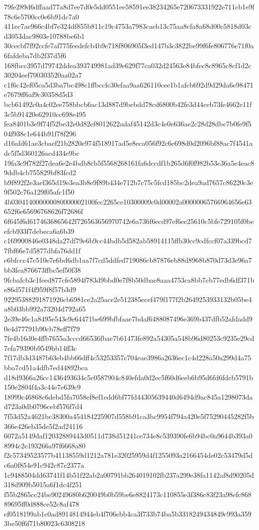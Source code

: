 {79fe289d6dffaad77a8d7ee7d0e5dd0551ee58591ee38234265e720673331922e711cb1e9f78c6e5700cc0e6b91dc7a0
411ec7ae966c4bf7e324df855b811c19c4753a7983caeb13c75aa8cfa8a68d00c5818d03cd3053dac9803e10788be6b1
30cecbf7f92ccfe7af775feedefcb4b9e718f806905f3ed147b3c3822be99f6fe806776e71f0a6fafdeba7db2f37d5f6
168fbcc3957d79742ddea393749981ad39e629f77ca032d24563e84bfec8c8965c8cf1d2c30204eef700303520aa02a7
c1f6c42ef05ca5d3ba7bc498c1ffbccfc30efaa9aa626110cee1b1afcb692d9d29da6e98471e7679ff6af9c30358d5d3
bcb61492c0a4c02ee758bbcb6ac13d887d9bebdd78cd6800b42fe3d44ceb73fe4662e11f3c5b91420e62910cc698e495
fea8401b3e9f74f52be32e0d82ef8012622adaf45142d3c4e0e636ae2c28d28dbc7b0fe9f504f938c1e644b91f78f296
d16afd61ae3cbaef21b2820e974f518917ad5e8eca056f92c6e698d0d2096bf88ac7f4541adc5f5d360126acd434e9bc
19fa3c9f782f27dea6e2e4bdb8cb5f5568268161fa6dccdf1b265d6f0f982b53c36a5e4eac89ddb4cb755829bf83fcd2
b9f892f2e3aef365d19e3ea3b8e9f89b434e712b7c75c5fcd185bc2dea9ad7657c86220c3e9f502c76a129f05afc1f50
4b030414000000080000002100fec2265ce10300009c0d00002a00000065766964656e63652f6e65696768626f72686f
6f645f6d6174636865642f726563656970742e6a736f6ecd97ef6ee25610c5bfe729105f0beefcb933f7debeca6a6b39
c169900846e0348da27df79e6b9cc44bdb5d582ab58914115ffb30cc9cdfccf07a339bcd77fbf66e7d5877dbfa76dd1f
e6bfccc47c510e7e6bd6db1aa7f7cd5ddfed719086cb87876eb88d8968b870d73d3e96a7bb3fea876673ffbc5ef50f38
9fcbafcb3c1feed877cfe5894f783d9bbd0e7f8b50dbae8aaa4753ca8bb7cb77edb6df371be86d571f4f959f8f57b3d9
92295388291871926cb6981ce2a25ace2e512385ecef479f177f2b2649253933132b05be4a8b03bb992a73204d792a65
2e39e46c1a8495e543e9e64471be699bfbfaae7bdaf6488087496e369b437dfb52afdadd90e4d77791b90cb78eff7f79
7fe4b16d0e4ffb7655a3cccd66536fbae7b61473fe892a54305a548b96d80253c9235e29cd7efa79390b9549bb14ff3c
7f17db3d3487b63eb4bb66dff4c53253357c704eae3986a2636ec1c4d228a50a299d4a75bba7cd51a4dfb7ed44892bca
d18d9366a26cc1436493634c5c0587904c840efda0d2ec5f60d6eeb6b95d6fd6fdcb5791b150e2804f4a3c44e7e639c9
18999c46868c6debd5fa7058ef8ef1edd6bf77fd44305639440d6494d9ac845a1298073dad723a0db0796cebf576f7d4
7f53d52a4621bc38300a454184225907d558b91ca3bc9954f794a420e5f75290445282f5b366e426eb35de5f2ad24116
6072a5149daf12032889443d0511d738d51241ce734e8c539390fe6b94bc0a9644b393a08994c2e193266a97f6668a80
f2c57349523577b41138559d1212a781e32025959d4f1255093a2166454de02c53479d5dc6a0f854e91c942c87c2377a
1c9488504dd63741f14b51f22ab2a00791bb264019102fb237a299e38fa1142af8d90205d318d909b5015a6f1dc4f251
f55b2865cc24be90249680b620049b0b59be6e8824173c110855e3f386c83f23a98efc86889695ff0d888ce52c8af478
ef0518199ab1c0ad8914814944eb4f706ebb4ca3f733b74ba5b3318249434849c993a3593be50f6f71b80023c6308218
}
